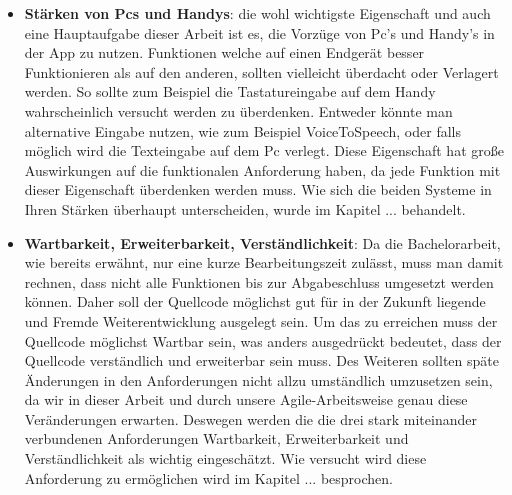 \begin{itemize}

	\item \textbf{Stärken von Pcs und Handys}: die wohl wichtigste Eigenschaft und auch eine Hauptaufgabe dieser Arbeit ist es, die Vorzüge von Pc's und Handy's in der App zu nutzen. Funktionen welche auf einen Endgerät besser Funktionieren als auf den anderen, sollten vielleicht überdacht oder Verlagert werden. So sollte zum Beispiel die Tastatureingabe auf dem Handy wahrscheinlich versucht werden zu überdenken. Entweder könnte man alternative Eingabe nutzen, wie zum Beispiel VoiceToSpeech, oder falls möglich wird die Texteingabe auf dem Pc verlegt. \newline%
	Diese Eigenschaft hat große Auswirkungen auf die funktionalen Anforderung haben, da jede Funktion mit dieser Eigenschaft überdenken werden muss. \newline%
	Wie sich die beiden Systeme in Ihren Stärken überhaupt unterscheiden, wurde im Kapitel ... behandelt.
		
	\item \textbf{Wartbarkeit, Erweiterbarkeit, Verständlichkeit}: Da die Bachelorarbeit, wie bereits erwähnt, nur eine kurze Bearbeitungszeit zulässt, muss man damit rechnen, dass nicht alle Funktionen bis zur Abgabeschluss umgesetzt werden können. Daher soll der Quellcode möglichst gut für in der Zukunft liegende und Fremde Weiterentwicklung ausgelegt sein. Um das zu erreichen muss der Quellcode möglichst Wartbar sein, was anders ausgedrückt bedeutet, dass der Quellcode verständlich und erweiterbar sein muss.\newline%
		Des Weiteren sollten späte Änderungen in den Anforderungen nicht allzu umständlich umzusetzen sein, da wir in dieser Arbeit und durch unsere Agile-Arbeitsweise genau diese Veränderungen erwarten. \newline%
		Deswegen werden die die drei stark miteinander verbundenen Anforderungen Wartbarkeit, Erweiterbarkeit und Verständlichkeit als wichtig eingeschätzt. \newline%
		Wie versucht wird diese Anforderung zu ermöglichen wird im Kapitel ... besprochen.
		

\end{itemize}
